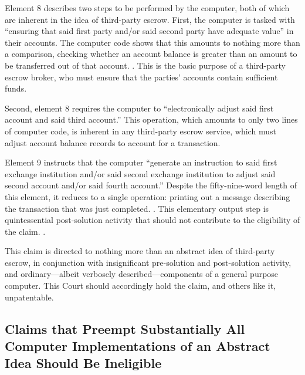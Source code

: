 \documentclass{scotus}
\begin{document}
Element 8 describes two steps to be performed by the computer, both of which are
inherent in the idea of third-party escrow. First, the computer is tasked with
``ensuring that said first party and/or said second party have adequate value''
in their accounts. The computer code shows that this amounts to nothing more
than a comparison, checking whether an account balance is greater than an amount
to be transferred out of that account. . This is the basic purpose of a third-party escrow broker, who
must ensure that the parties' accounts contain sufficient funds.

Second, element 8 requires the computer to ``electronically adjust said first
account and said third account.'' This operation, which amounts to only two
lines of computer code,
is inherent in any third-party escrow service, which must adjust account balance
records to account for a transaction.

Element 9 instructs that the computer ``generate an instruction to said first
exchange institution and/or said second exchange institution to adjust said
second account and/or said fourth account.'' Despite the fifty-nine-word length
of this element, it reduces to a single operation: printing out a
message describing the transaction that was just completed. . This elementary output step is quintessential
post-solution activity
that should not contribute to the eligibility of the claim. .

This claim is directed to nothing more than an abstract idea of
third-party escrow, in conjunction with insignificant pre-solution and
post-solution activity, and ordinary---albeit verbosely described---components
of
a general purpose computer.
This Court should accordingly hold the claim, and others like it, unpatentable.



%
%
\subsection{Claims that Preempt Substantially All Computer Implementations of an
Abstract Idea Should Be Ineligible}

\iffalse
A patent claim with the ``practical effect'' of removing an abstract idea from
the public domain is ineligible under \inline{101}. \sentence{see benson at
71-72}.
Claim 26 of the '375 patent would have the practical effect of removing all uses
of an abstract idea \emph{implemented on a general-purpose computer} from the
public domain.
\fi
\end{document}
